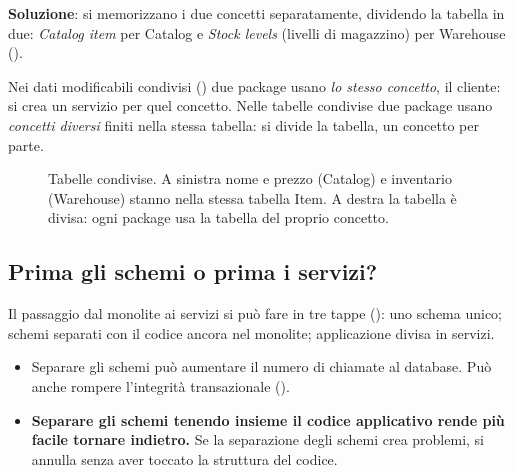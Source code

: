 \textbf{Soluzione}: si memorizzano i due concetti separatamente, dividendo la tabella in due: \emph{Catalog item} per
Catalog e \emph{Stock levels} (livelli di magazzino) per Warehouse ().

\begin{attenzione}
Nei dati modificabili condivisi () due package usano \emph{lo stesso concetto}, il cliente: si
crea un servizio per quel concetto. Nelle tabelle condivise due package usano \emph{concetti diversi} finiti nella
stessa tabella: si divide la tabella, un concetto per parte.
\end{attenzione}

\begin{figure}[ht]
\centering
{}
\caption{Tabelle condivise. A sinistra nome e prezzo (Catalog) e inventario (Warehouse) stanno nella stessa tabella Item.
A destra la tabella è divisa: ogni package usa la tabella del proprio concetto.}
\label{fig:split-tabelle}
\end{figure}

\subsection{Prima gli schemi o prima i servizi?}
\label{sec:split-ordine}

Il passaggio dal monolite ai servizi si può fare in tre tappe (): uno schema unico; schemi
separati con il codice ancora nel monolite; applicazione divisa in servizi.
\begin{itemize}
  \item Separare gli schemi può aumentare il numero di chiamate al database. Può anche rompere l'integrità
    transazionale ().
  \item \textbf{Separare gli schemi tenendo insieme il codice applicativo rende più facile tornare indietro.} Se la
    separazione degli schemi crea problemi, si annulla senza aver toccato la struttura del codice.
\end{itemize}

